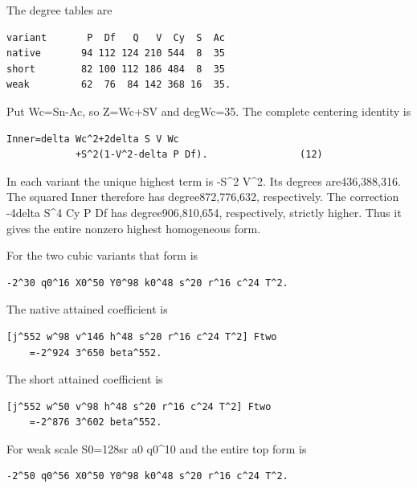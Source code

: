The degree tables are



\begin{verbatim}
variant       P  Df   Q   V  Cy  S  Ac
native       94 112 124 210 544  8  35
short        82 100 112 186 484  8  35
weak         62  76  84 142 368 16  35.
\end{verbatim}

Put Wc=\allowbreak{}Sn-Ac, so Z=\allowbreak{}Wc+\allowbreak{}SV and degWc=\allowbreak{}35. The complete centering identity is



\begin{verbatim}
Inner=delta Wc^2+2delta S V Wc
            +S^2(1-V^2-delta P Df).                (12)
\end{verbatim}

In each variant the unique highest term is -S\textasciicircum{}\allowbreak{}2 V\textasciicircum{}\allowbreak{}2. Its degrees are436,388,316. The squared Inner therefore has degree872,776,632, respectively. The correction -4delta S\textasciicircum{}\allowbreak{}4 Cy P Df has degree906,810,654, respectively, strictly higher. Thus it gives the entire nonzero highest homogeneous form.



For the two cubic variants that form is



\begin{verbatim}
-2^30 q0^16 X0^50 Y0^98 k0^48 s^20 r^16 c^24 T^2.
\end{verbatim}

The native attained coefficient is



\begin{verbatim}
[j^552 w^98 v^146 h^48 s^20 r^16 c^24 T^2] Ftwo
    =-2^924 3^650 beta^552.
\end{verbatim}

The short attained coefficient is



\begin{verbatim}
[j^552 w^50 v^98 h^48 s^20 r^16 c^24 T^2] Ftwo
    =-2^876 3^602 beta^552.
\end{verbatim}

For weak scale S0=\allowbreak{}128sr a0 q0\textasciicircum{}\allowbreak{}10 and the entire top form is



\begin{verbatim}
-2^50 q0^56 X0^50 Y0^98 k0^48 s^20 r^16 c^24 T^2.
\end{verbatim}

